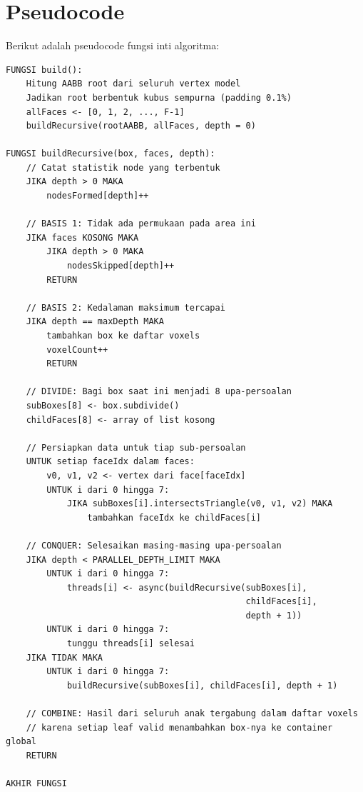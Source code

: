 \documentclass[12pt, a4paper]{report}
\begin{document}
\section{Pseudocode}

Berikut adalah pseudocode fungsi inti algoritma:

\begin{lstlisting}[style=pseudocode,
  caption={Pseudocode Algoritma Voxelization Divide and Conquer},
  label={lst:pseudo}]
FUNGSI build():
    Hitung AABB root dari seluruh vertex model
    Jadikan root berbentuk kubus sempurna (padding 0.1%)
    allFaces <- [0, 1, 2, ..., F-1]
    buildRecursive(rootAABB, allFaces, depth = 0)

FUNGSI buildRecursive(box, faces, depth):
    // Catat statistik node yang terbentuk
    JIKA depth > 0 MAKA
        nodesFormed[depth]++

    // BASIS 1: Tidak ada permukaan pada area ini
    JIKA faces KOSONG MAKA
        JIKA depth > 0 MAKA
            nodesSkipped[depth]++
        RETURN

    // BASIS 2: Kedalaman maksimum tercapai
    JIKA depth == maxDepth MAKA
        tambahkan box ke daftar voxels
        voxelCount++
        RETURN

    // DIVIDE: Bagi box saat ini menjadi 8 upa-persoalan
    subBoxes[8] <- box.subdivide()
    childFaces[8] <- array of list kosong

    // Persiapkan data untuk tiap sub-persoalan
    UNTUK setiap faceIdx dalam faces:
        v0, v1, v2 <- vertex dari face[faceIdx]
        UNTUK i dari 0 hingga 7:
            JIKA subBoxes[i].intersectsTriangle(v0, v1, v2) MAKA
                tambahkan faceIdx ke childFaces[i]

    // CONQUER: Selesaikan masing-masing upa-persoalan
    JIKA depth < PARALLEL_DEPTH_LIMIT MAKA
        UNTUK i dari 0 hingga 7:
            threads[i] <- async(buildRecursive(subBoxes[i],
                                               childFaces[i],
                                               depth + 1))
        UNTUK i dari 0 hingga 7:
            tunggu threads[i] selesai
    JIKA TIDAK MAKA
        UNTUK i dari 0 hingga 7:
            buildRecursive(subBoxes[i], childFaces[i], depth + 1)

    // COMBINE: Hasil dari seluruh anak tergabung dalam daftar voxels
    // karena setiap leaf valid menambahkan box-nya ke container global
    RETURN

AKHIR FUNGSI

\end{lstlisting}
\end{document}

